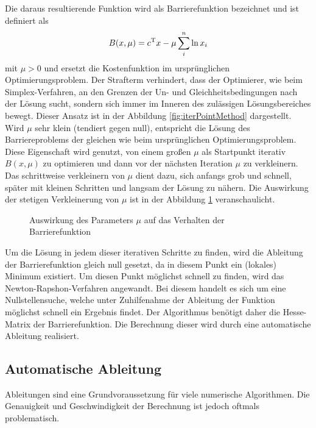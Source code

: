 \documentclass{like}
\begin{document}
Die daraus resultierende Funktion wird als Barrierefunktion bezeichnet und ist definiert als \\
\begin{equation}
	B(x,\mu) =  c\textsuperscript{T}x - \mu \sum_{i}^{n} \ln x_i
\end{equation}
mit $\mu > 0$ und ersetzt die Kostenfunktion im ursprünglichen Optimierungsproblem. Der Strafterm verhindert, dass der Optimierer, wie beim Simplex-Verfahren, an den Grenzen der Un- und Gleichheitsbedingungen nach der Lösung sucht, sondern sich immer im Inneren des zulässigen Lösungsbereiches bewegt. Dieser Ansatz ist in der Abbildung \ref{fig:iterPointMethod} dargestellt.
Wird \(\mu\) sehr klein (tendiert gegen null), entspricht die Lösung des Barriereproblems der gleichen wie beim ursprünglichen Optimierungsproblem. Diese Eigenschaft wird genutzt, von einem großen \(\mu\) als Startpunkt iterativ $B(x,\mu)$ zu optimieren und dann vor der nächsten Iteration \(\mu\) zu verkleinern. Das schrittweise verkleinern von $\mu$ dient dazu, sich anfangs grob und schnell, später mit kleinen Schritten und langsam der Lösung zu nähern. Die Auswirkung der stetigen Verkleinerung von \(\mu\) ist in der Abbildung \ref{fig:iterPointLn} veranschaulicht.

\begin{figure}[ht!]
	\centering
	 
	\caption{Auswirkung des Parameters $\mu$ auf das Verhalten der Barrierefunktion}
	\label{fig:iterPointLn}
\end{figure}

Um die Lösung in jedem dieser iterativen Schritte zu finden, wird die Ableitung der Barrierefunktion gleich null gesetzt, da in diesem Punkt ein (lokales) Minimum existiert. Um diesen Punkt möglichst schnell zu finden, wird das Newton-Rapshon-Verfahren angewandt. Bei diesem handelt es sich um eine Nullstellensuche, welche unter Zuhilfenahme der Ableitung der Funktion möglichst schnell ein Ergebnis findet. Der Algorithmus benötigt daher die Hesse-Matrix der Barrierefunktion. Die Berechnung dieser wird durch eine automatische Ableitung realisiert.

\subsection{Automatische Ableitung} 

Ableitungen sind eine Grundvoraussetzung für viele numerische Algorithmen. Die Genauigkeit und Geschwindigkeit der Berechnung ist jedoch oftmals problematisch.
\end{document}

